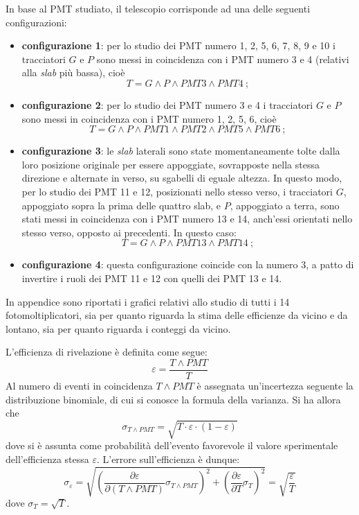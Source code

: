 \documentclass[10pt, oneside, a4paper]{article}   	%
\renewcommand{\epsilon}{\varepsilon}			%
\begin{document}
In base al PMT studiato, il telescopio corrisponde ad una delle seguenti configurazioni:
\begin{itemize}
	\item \textbf{configurazione 1}: per lo studio dei PMT numero 1, 2, 5, 6, 7, 8, 9 e 10 i tracciatori $G$ e $P$ sono messi in coincidenza con i PMT numero 3 e 4 (relativi alla \emph{slab} più bassa), cioè \[T = G\wedge P \wedge PMT3 \wedge PMT4 \ ;\]
%
	\item \textbf{configurazione 2}: per lo studio dei PMT numero 3 e 4 i tracciatori $G$ e $P$ sono messi in coincidenza con i PMT numero 1, 2, 5, 6, cioè \[T = G\wedge P \wedge PMT1 \wedge PMT2 \wedge PMT5 \wedge PMT6 \ ; \]
%
	\item \textbf{configurazione 3}: le \emph{slab} laterali sono state momentaneamente tolte dalla loro posizione originale per essere appoggiate, sovrapposte nella stessa direzione e alternate in verso, su sgabelli di eguale altezza. In questo modo, per lo studio dei PMT 11 e 12, posizionati nello stesso verso, i tracciatori $G$, appoggiato sopra la prima delle quattro slab, e $P$, appoggiato a terra, sono stati messi in coincidenza con i PMT numero 13 e 14, anch'essi orientati nello stesso verso, opposto ai precedenti. In questo caso: \[T = G\wedge P \wedge PMT13 \wedge PMT14 \ ;\]
%
	\item \textbf{configurazione 4}: questa configurazione coincide con la numero 3, a patto di invertire i ruoli dei PMT 11 e 12 con quelli dei PMT 13 e 14. 
\end{itemize}
In appendice sono riportati i grafici relativi allo studio di tutti i 14 fotomoltiplicatori, sia per quanto riguarda la stima delle efficienze da vicino e da lontano, sia per quanto riguarda i conteggi da vicino.

L'efficienza di rivelazione è definita come segue:
$$\epsilon=\frac{T\wedge PMT}{T}$$
Al numero di eventi in coincidenza $T\wedge PMT$ è assegnata un'incertezza seguente la distribuzione binomiale, di cui si conosce la formula della varianza.  
Si ha allora che 
\[\sigma_{T\wedge PMT} = \sqrt{T \cdot \varepsilon \cdot  (1-\varepsilon)}\]
dove si è assunta come probabilità dell'evento favorevole il valore sperimentale dell'efficienza stessa $\varepsilon$.
L'errore sull'efficienza è dunque:
$$\sigma_\epsilon=\sqrt{ \left(\frac{\partial\epsilon}{\partial (T\wedge PMT)}\sigma_{T\wedge PMT}\right)^2 + \left(\frac{\partial \epsilon}{\partial T}\sigma_T\right)^2 }=\sqrt{\frac{\epsilon}{T}}$$
dove $\sigma_T = \sqrt{T}$.
\end{document}
